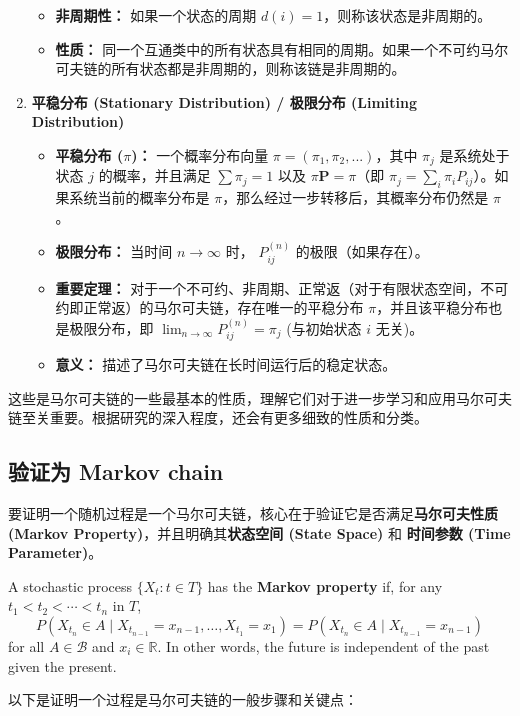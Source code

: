 \begin{enumerate}
\begin{itemize}
		\item \textbf{非周期性：} 如果一个状态的周期 $d(i) = 1$，则称该状态是非周期的。
		\item \textbf{性质：} 同一个互通类中的所有状态具有相同的周期。如果一个不可约马尔可夫链的所有状态都是非周期的，则称该链是非周期的。
	\end{itemize}
	\item \textbf{平稳分布 (Stationary Distribution) / 极限分布 (Limiting Distribution)}
	\begin{itemize}
		\item \textbf{平稳分布 ($\pi$)：} 一个概率分布向量 $\pi = (\pi_1, \pi_2, ...)$，其中 $\pi_j$ 是系统处于状态 $j$ 的概率，并且满足 $\sum \pi_j = 1$ 以及 $\pi \mathbf{P} = \pi$（即 $\pi_j = \sum_i \pi_i P_{ij}$）。如果系统当前的概率分布是 $\pi$，那么经过一步转移后，其概率分布仍然是 $\pi$。
		\item \textbf{极限分布：} 当时间 $n \to \infty$ 时， $P_{ij}^{(n)}$ 的极限（如果存在）。
		\item \textbf{重要定理：} 对于一个不可约、非周期、正常返（对于有限状态空间，不可约即正常返）的马尔可夫链，存在唯一的平稳分布 $\pi$，并且该平稳分布也是极限分布，即 $\lim_{n \to \infty} P_{ij}^{(n)} = \pi_j$ (与初始状态 $i$ 无关)。
		\item \textbf{意义：} 描述了马尔可夫链在长时间运行后的稳定状态。
	\end{itemize}
\end{enumerate}

这些是马尔可夫链的一些最基本的性质，理解它们对于进一步学习和应用马尔可夫链至关重要。根据研究的深入程度，还会有更多细致的性质和分类。

\subsection{验证为 Markov chain}

要证明一个随机过程是一个马尔可夫链，核心在于验证它是否满足\textbf{马尔可夫性质 (Markov Property)}，并且明确其\textbf{状态空间 (State Space)} 和 \textbf{时间参数 (Time Parameter)}。

\begin{definition}
A stochastic process $\{X_t: t \in T\}$ has the \textbf{Markov property} if, for any $t_1 < t_2 < \cdots < t_n$ in $T$,
\[
P\left(X_{t_n} \in A \mid X_{t_{n-1}}=x_{n-1}, \ldots, X_{t_1}=x_1\right)=P\left(X_{t_n} \in A \mid X_{t_{n-1}}=x_{n-1}\right)
\]for all $A \in \mathcal{B}$ and $x_i \in \mathbb{R}$. In other words, the future is independent of the past given the present.
\end{definition}
以下是证明一个过程是马尔可夫链的一般步骤和关键点：

